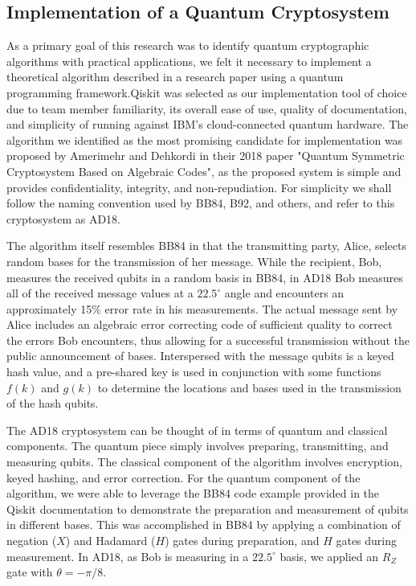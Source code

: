 \documentclass[sigconf]{acmart}
\begin{document}
\subsection{Implementation of a Quantum Cryptosystem}\label{sec:implementation}
As a primary goal of this research was to identify quantum cryptographic algorithms with practical applications, we felt it necessary to implement a theoretical algorithm described in a research paper using a quantum programming framework.Qiskit was selected as our implementation tool of choice due to team member familiarity, its overall ease of use, quality of documentation, and simplicity of running against IBM's cloud-connected quantum hardware. The algorithm we identified as the most promising candidate for implementation was proposed by Amerimehr and Dehkordi in their 2018 paper "Quantum Symmetric Cryptosystem Based on Algebraic Codes"\cite{amerimehr_quantum_2018}, as the proposed system is simple and provides confidentiality, integrity, and non-repudiation. For simplicity we shall follow the naming convention used by BB84, B92, and others, and refer to this cryptosystem as AD18. 

The algorithm itself resembles BB84 in that the transmitting party, Alice, selects random bases for the transmission of her message. While the recipient, Bob, measures the received qubits in a random basis in BB84, in AD18 Bob measures all of the received message values at a $22.5^{\circ}$ angle and encounters an approximately 15\% error rate in his measurements. The actual message sent by Alice includes an algebraic error correcting code of sufficient quality to correct the errors Bob encounters, thus allowing for a successful transmission without the public announcement of bases. Interspersed with the message qubits is a keyed hash value, and a pre-shared key is used in conjunction with some functions $f(k)$ and $g(k)$ to determine the locations and bases used in the transmission of the hash qubits.

The AD18 cryptosystem can be thought of in terms of quantum and classical components. The quantum piece simply involves preparing, transmitting, and measuring qubits. The classical component of the algorithm involves encryption, keyed hashing, and error correction. For the quantum component of the algorithm, we were able to leverage the BB84 code example provided in the Qiskit documentation\cite{noauthor_quantum_nodate} to demonstrate the preparation and measurement of qubits in different bases. This was accomplished in BB84 by applying a combination of negation ($X$) and Hadamard ($H$) gates during preparation, and $H$ gates during measurement. In AD18, as Bob is measuring in a $22.5^{\circ}$ basis, we applied an $R_Z$ gate with $\theta = -\pi/8$.
\end{document}
